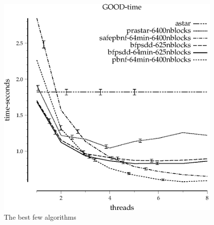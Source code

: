 \documentclass{article}
\begin{document}
\begin{figure}
\begin{center}
\includegraphics{GOOD-time}
\end{center}
\caption{The best few algorithms}
\end{figure}
\end{document}
